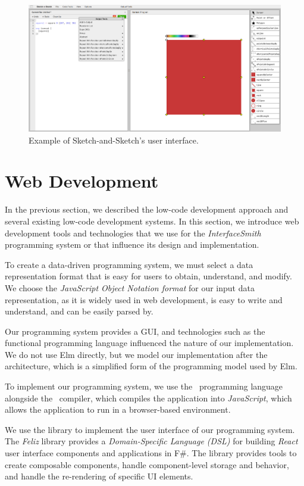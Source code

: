 \begin{figure}[htbp]
	\centering
	\includegraphics[width=1\linewidth]{img/sketch.pdf}
	\caption{Example of Sketch-and-Sketch's user interface. }
	\label{fig:sketch}
\end{figure}

\newpage
\section{Web Development}
In the previous section, we described the low-code development approach and several existing low-code development systems.
In this section, we introduce web development tools and technologies that we use for the \emph{InterfaceSmith} programming system or that influence its design and implementation.

To create a data-driven programming system, we must select a data representation format that is easy for users to obtain, understand, and modify.
We choose the \emph{JavaScript Object Notation format} for our input data representation, as it is widely used in web development, is easy to write and understand, and can be easily parsed by.

Our programming system provides a GUI, and technologies such as the~\citet{eml} functional programming language influenced the nature of our implementation.
We do not use Elm directly, but we model our implementation after the~\citet{elmish} architecture, which is a simplified form of the programming model used by Elm.

To implement our programming system, we use the~\citet{fsharp} programming language alongside the~\citet{fable} compiler, which compiles the application into \emph{JavaScript},
which allows the application to run in a browser-based environment.

We use the \citet{feliz} library to implement the user interface of our programming system.
The \emph{Feliz} library provides a \emph{Domain-Specific Language (DSL)} for building \emph{React} user interface components and applications in F\#.
The \citet{react} library provides tools to create composable components, handle component-level storage and behavior, and handle the re-rendering of specific UI elements.

